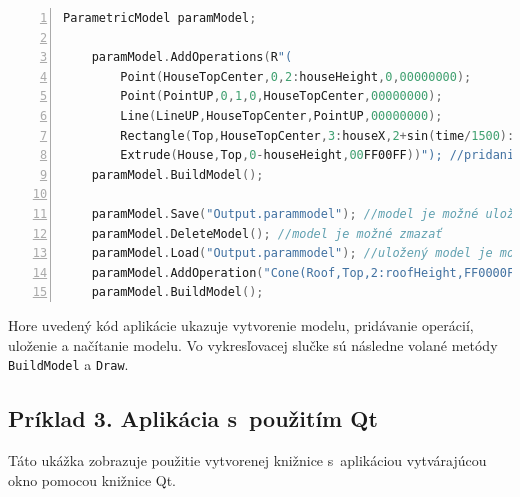 \vspace{1pt}
\begin{minipage}{\linewidth}
\begin{lstlisting}[language=C,frame=tb,numbers=left,emph={void,int,char,double,float,unsigned},emphstyle={\color{blue}},tabsize=2]
	ParametricModel paramModel;

	paramModel.AddOperations(R"(
        Point(HouseTopCenter,0,2:houseHeight,0,00000000);
        Point(PointUP,0,1,0,HouseTopCenter,00000000);
        Line(LineUP,HouseTopCenter,PointUP,00000000);
        Rectangle(Top,HouseTopCenter,3:houseX,2+sin(time/1500):houseY,&\newline&sin(time/1000)-0.2:rotation,LineUP,00000000);
        Extrude(House,Top,0-houseHeight,00FF00FF))"); //pridanie množiny operácii na tvorbu základov domu (zelená časť domu)
	paramModel.BuildModel(); 
	
	paramModel.Save("Output.parammodel"); //model je možné uložiť 
	paramModel.DeleteModel(); //model je možné zmazať
	paramModel.Load("Output.parammodel"); //uložený model je možné znova &\newline&načítať 
	paramModel.AddOperation("Cone(Roof,Top,2:roofHeight,FF0000FF)"); &\newline&//pridanie operácie do načítaného modelu (strecha-červená časť domu)
	paramModel.BuildModel();
\end{lstlisting}
\end{minipage}
Hore uvedený kód aplikácie ukazuje vytvorenie modelu, pridávanie operácií, uloženie a načítanie modelu. Vo vykresľovacej slučke sú následne volané metódy \texttt{BuildModel} a \texttt{Draw}.

\subsection*{Príklad 3. Aplikácia s~použitím Qt}\label{priklad3}
Táto ukážka zobrazuje použitie vytvorenej knižnice s~aplikáciou vytvárajúcou okno pomocou knižnice Qt. 



